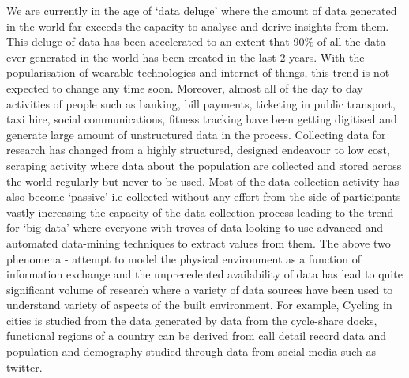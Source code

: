 We are currently in the age of `data deluge' where the amount of data generated in the world far exceeds the capacity to analyse and derive insights from them.
This deluge of data has been accelerated to an extent that 90\% of all the data ever generated in the world has been created in the last 2 years.
With the popularisation of wearable technologies and internet of things, this trend is not expected to change any time soon.
Moreover, almost all of the day to day activities of people such as banking, bill payments, ticketing in public transport, taxi hire, social communications, fitness tracking have been getting digitised and generate large amount of unstructured data in the process.
Collecting data for research has changed from a highly structured, designed endeavour to low cost, scraping activity where data about the population are collected and stored across the world regularly but never to be used. 
Most of the data collection activity has also become `passive' i.e collected without any effort from the side of participants vastly increasing the capacity of the data collection process leading to the trend for `big data' where everyone with troves of data looking to use advanced and automated data-mining techniques to extract values from them.
The above two phenomena - attempt to model the physical environment as a function of information exchange and the unprecedented availability of data has lead to quite significant volume of research where a variety of data sources have been used to understand variety of aspects of the built environment.
For example, Cycling in cities is studied from the data generated by data from the cycle-share docks, functional regions of a country can be derived from call detail record data and population and demography studied through data from social media such as twitter. 


